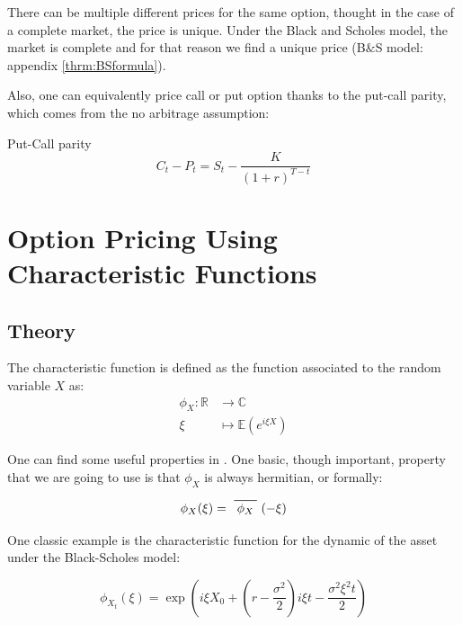 There can be multiple different prices for the same option, thought in the case of a complete market, the price is unique. Under the Black and Scholes model, the market is complete and for that reason we find a unique price (B$\&$S model: appendix \ref{thrm:BSformula}). 



Also, one can equivalently price call or put option thanks to the put-call parity, which comes from the no arbitrage assumption: 


\begin{theoreme}{Put-Call parity}
$$C_t - P_t = S_t - \frac K {(1+r)^{T-t} }$$
\end{theoreme}











\section{Option Pricing Using Characteristic Functions}
\subsection{Theory}

\begin{definition}
The characteristic function is defined as the function associated to the random variable $X$ as:
\begin{align*}
  \phi_X \colon \mathbb R &\to \mathbb C \\
  \xi &\mapsto \mathbb E ( e^{i \xi X} ) 
\end{align*}

One can find some useful properties in \cite{num_methods}. One basic, though important, property that we are going to use is that $\phi_X$ is always hermitian, or formally: 

$$\phi_X( \xi ) = \conj{\phi_X} ( -\xi )$$


\end{definition} 




One classic example is the characteristic function for the dynamic of the asset under the Black-Scholes model:

\begin{equation}
\label{eq:charac_BS}
\phi_{X_t} (\xi) = \exp \left ( i \xi X_0 + ( r - \frac{ \sigma^2}{2}
) i \xi t - \frac{\sigma ^2 \xi ^2 t}{2} \right )
\end{equation}

